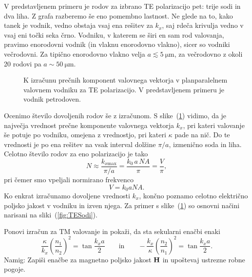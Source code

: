 V predstavljenem primeru je rodov za izbrano TE polarizacijo pet: trije sodi in dva liha. Z grafa razberemo 
še eno pomembno lastnost. Ne glede na to, kako tanek je vodnik, vedno obstaja vsaj ena rešitev za $k_x$, 
saj rdeča krivulja vedno v vsaj eni točki seka črno. Vodniku, v katerem se širi en sam rod valovanja, 
pravimo enorodovni vodnik (in vlaknu enorodovno vlakno), 
sicer so vodniki večrodovni. Za tipično enorodovno vlakno velja 
$a\lesssim 5~\si{\micro\meter}$, za večrodovno z okoli 20 rodovi pa $a\sim 50~\si{\micro\meter}$.
\begin{figure}[h]
\centering
\def\svgwidth{90truemm} 

\caption{K izračunu prečnih komponent valovnega vektorja v planparalelnem valovnem vodniku
za TE polarizacijo. V predstavljenem primeru je vodnik petrodoven.}
\label{fig:TEsec}
\end{figure}

Ocenimo število dovoljenih rodov še z izračunom. S slike~(\ref{fig:TEsec}) vidimo, da je največja 
vrednost prečne komponente valovnega vektorja $k_x$, pri kateri valovanje še potuje po vodniku, omejena z vrednostjo, 
pri kateri $\kappa$ pade na nič. Do te vrednosti je po ena rešitev na vsak interval dolžine $\pi/a$, izmenično
soda in liha. Celotno število rodov za eno polarizacijo je tako
\begin{equation}
N \approx \frac{k_{x\mathrm{max}}}{\pi/a}  = \frac{k_0\, a\, NA }{\pi} = \frac{V}{\pi},
\end{equation}
pri  čemer smo vpeljali normirano frekvenco
\begin{equation}
V = k_0 a NA.
\end{equation}
Ko enkrat izračunamo dovoljene vrednosti $k_x$, končno poznamo celotno električno poljsko
jakost v vodniku in izven njega. Za primer s slike~(\ref{fig:TEsec}) so osnovni načini 
narisani na sliki~(\ref{fig:TESodi}).

\begin{definition}
\label{naloga:TM}
Ponovi izračun za TM valovanje in pokaži, da sta sekularni enačbi enaki 
\begin{equation}
\frac{\kappa}{k_x} \left(\frac{n_1}{n_2}\right)^2= 
\tan \frac{k_x a}{2} \qquad \mathrm{in} \qquad -\frac{k_x}{\kappa} \left(\frac{n_2}{n_1}\right)^2= 
\tan \frac{k_x a}{2}.
\end{equation}
Namig: Zapiši enačbe za magnetno poljsko jakost ${\bf H}$ in upoštevaj ustrezne robne pogoje.
\end{definition}

